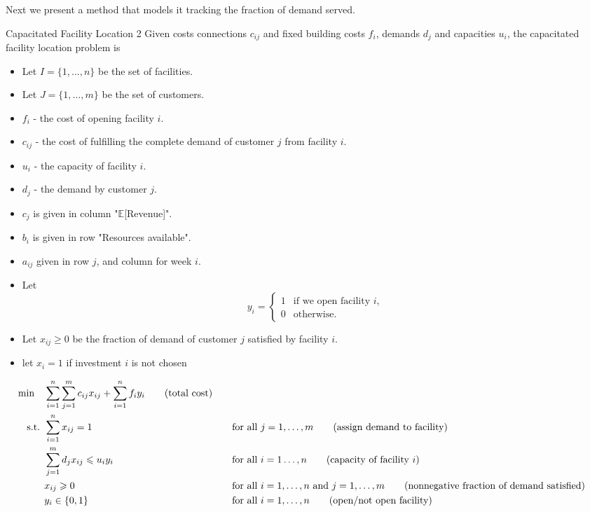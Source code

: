 Next we present a method that models it tracking the fraction of demand served.
\begin{general}{Capacitated Facility Location 2}{\npcomplete}
Given costs connections $c_{ij}$ and fixed building costs $f_i$, demands $d_j$ and capacities $u_i$, the capacitated facility location problem is 

\begin{itemize}
\item Let $I = \{1,\dots, n\}$ be the set of facilities.
\item Let $J = \{1, \dots, m\}$ be the set of customers.
\end{itemize}

\begin{itemize}
\item $f_i$ - the cost of opening facility $i$.
\item $c_{ij}$ - the cost of fulfilling the complete demand of customer $j$ from facility $i$.
\item $u_{i}$ - the capacity of facility $i$.
\item $d_{j}$ - the demand by customer $j$.
\item $c_j$ is given in column "$\mathbb{E}$[Revenue]".
\item $b_i$ is given in row "Resources available".
\item $a_{ij}$ given in row $j$, and column for week $i$.
\end{itemize}

\begin{itemize}
\item Let 
\begin{equation*}
y_{i} = \begin{cases}
1 & \text{if we open facility $i$,}\\
0 & \text{otherwise.}
\end{cases}
\end{equation*}
\item Let $x_{ij} \geq 0$ be the fraction of demand of customer $j$ satisfied by facility $i$.
\item let $x_i = 1$ if investment $i$ is not chosen
\end{itemize}

\begin{align}
\min \quad & \displaystyle\sum_{i=1}^n\sum_{j=1}^mc_{ij}x_{ij}+\sum_{i=1}^nf_iy_i   \tag{total cost} \\
\mbox{ s.t. }        & \displaystyle\sum_{i=1}^nx_{ij}=1 &&\quad \mbox{for all } j=1,\dots,m   \tag{assign demand to facility} \\
& \displaystyle \sum_{j=1}^md_jx_{ij}\leqslant u_iy_i &&\quad \mbox{for all } i=1\dots,n   \tag{capacity of facility $i$} \\
& x_{ij}\geqslant0 &&\quad \mbox{for all } i=1,\dots,n \mbox{ and }j=1,\dots,m   \tag{nonnegative fraction of demand satisfied} \\
& y_i\in\{0,1\} &&\quad \mbox{for all } i=1,\dots,n   \tag{open/not open facility}
\end{align}

\end{general}

